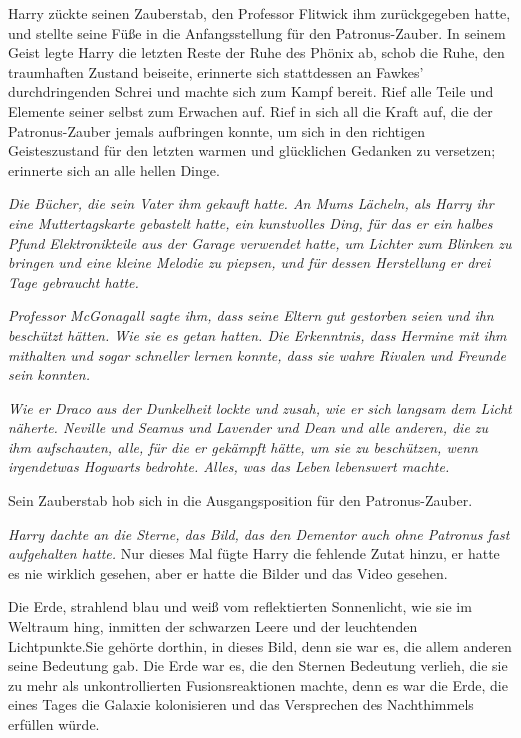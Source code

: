{Harry zückte seinen Zauberstab, den Professor Flitwick ihm zurückgegeben hatte, und stellte seine Füße in die Anfangsstellung für den Patronus-Zauber. In seinem Geist legte Harry die letzten Reste der Ruhe des Phönix ab, schob die Ruhe, den traumhaften Zustand beiseite, erinnerte sich stattdessen an Fawkes' durchdringenden Schrei und machte sich zum Kampf bereit. Rief alle Teile und Elemente seiner selbst zum Erwachen auf. Rief in sich all die Kraft auf, die der Patronus-Zauber jemals aufbringen konnte, um sich in den richtigen Geisteszustand für den letzten warmen und glücklichen Gedanken zu versetzen; erinnerte sich an alle hellen Dinge.

\emph{Die Bücher, die sein Vater ihm gekauft hatte. An Mums Lächeln, als Harry ihr eine Muttertagskarte gebastelt hatte, ein kunstvolles Ding, für das er ein halbes Pfund Elektronikteile aus der Garage verwendet hatte, um Lichter zum Blinken zu bringen und eine kleine Melodie zu piepsen, und für dessen Herstellung er drei Tage gebraucht hatte.}

\emph{Professor McGonagall sagte ihm, dass seine Eltern gut gestorben seien und ihn beschützt hätten. Wie sie es getan hatten. Die Erkenntnis, dass Hermine mit ihm mithalten und sogar schneller lernen konnte, dass sie wahre Rivalen und Freunde sein konnten.}

\emph{Wie er Draco aus der Dunkelheit lockte und zusah, wie er sich langsam dem Licht näherte. Neville und Seamus und Lavender und Dean und alle anderen, die zu ihm aufschauten, alle, für die er gekämpft hätte, um sie zu beschützen, wenn irgendetwas Hogwarts bedrohte. Alles, was das Leben lebenswert machte.}

Sein Zauberstab hob sich in die Ausgangsposition für den Patronus-Zauber.

\emph{Harry dachte an die Sterne, das Bild, das den Dementor auch ohne Patronus fast aufgehalten hatte.} Nur dieses Mal fügte Harry die fehlende Zutat hinzu, er hatte es nie wirklich gesehen, aber er hatte die Bilder und das Video gesehen.

Die Erde, strahlend blau und weiß vom reflektierten Sonnenlicht, wie sie im Weltraum hing, inmitten der schwarzen Leere und der leuchtenden Lichtpunkte.Sie gehörte dorthin, in dieses Bild, denn sie war es, die allem anderen seine Bedeutung gab. Die Erde war es, die den Sternen Bedeutung verlieh, die sie zu mehr als unkontrollierten Fusionsreaktionen machte, denn es war die Erde, die eines Tages die Galaxie kolonisieren und das Versprechen des Nachthimmels erfüllen würde.

}
